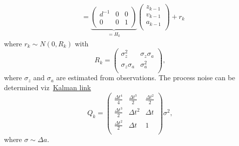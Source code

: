 \begin{example}
\begin{equation}
\begin{split}
			&= \underbrace{\begin{pmatrix}
					d^{-1} & 0 & 0\\
					0 & 0 & 1 
			\end{pmatrix}}_{=H_k}\begin{pmatrix}
				z_{k-1}\\ v_{k-1} \\ a_{k-1}\\
			\end{pmatrix}+r_k
		\end{split}
	\end{equation}
	where $r_k \sim N(0,R_k)$ with 
	\begin{equation}
		R_k = \begin{pmatrix}
			\sigma_z^2 & \sigma_z\sigma_a\\
			\sigma_z\sigma_a & \sigma_a^2 \\
		\end{pmatrix},
	\end{equation}
	where $\sigma_z$ and $\sigma_a$ are estimated from observations. The process noise can be determined viz~\href{https://github.com/rlabbe/Kalman-and-Bayesian-Filters-in-Python/blob/master/07-Kalman-Filter-Math.ipynb}{Kalman link}
	\begin{equation}
		Q_k = \begin{pmatrix}
			\frac{\Delta t^4}{4} & \frac{\Delta t^3}{2} & \frac{\Delta t^2}{2}\\
			\frac{\Delta t^3}{2} & \Delta t^2 & \Delta t\\
			\frac{\Delta t^2}{2} & \Delta t & 1\\
		\end{pmatrix}\sigma^2,
	\end{equation}
	where $\sigma \sim \Delta a$.
\end{example}


